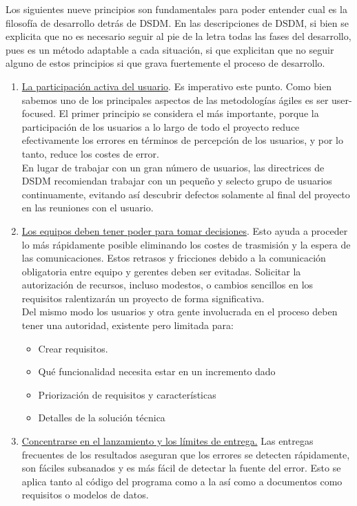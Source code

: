 \documentclass[12pt,a4paper]{article}
\begin{document}
Los siguientes nueve principios son fundamentales para poder entender cual es la filosofía de desarrollo detrás de DSDM. En las descripciones de DSDM, si bien se explicita que no es necesario seguir al pie de la letra todas las fases del desarrollo, pues es un método adaptable a cada situación, si que explicitan que no seguir alguno de estos principios si que grava fuertemente el proceso de desarrollo.

\begin{enumerate}
	\item \underline{La participación activa del usuario}. Es imperativo este punto. Como bien sabemos uno de los principales aspectos de las metodologías ágiles es ser user-focused. El primer principio se considera el más importante, porque la participación de los usuarios a lo largo de todo el proyecto reduce efectivamente los errores en términos de percepción de los usuarios, y por lo tanto, reduce los costes de error. \\


En lugar de trabajar con un gran número de usuarios, las directrices de  DSDM  recomiendan trabajar con un pequeño y selecto grupo de usuarios continuamente, evitando así descubrir defectos solamente al final del proyecto en las reuniones con el usuario.\\


\item \underline{Los equipos deben tener poder para tomar decisiones}. Esto ayuda a proceder lo más rápidamente posible eliminando los costes de trasmisión y la espera de las comunicaciones. Estos retrasos y fricciones debido a la comunicación obligatoria entre equipo y gerentes deben ser evitadas. Solicitar
la autorización de recursos, incluso modestos, o cambios sencillos en los requisitos ralentizarán un proyecto de forma significativa.\\

 Del mismo modo los usuarios y otra gente involucrada en el proceso deben tener una autoridad, existente pero limitada para:
\begin{itemize}
	\item  Crear requisitos.
    \item Qué funcionalidad necesita estar en un incremento dado
    \item Priorización de requisitos y características
    \item Detalles de la solución técnica
\end{itemize}


\item \underline{Concentrarse en el lanzamiento y los límites de entrega.} Las entregas frecuentes de los resultados aseguran que los errores se detecten rápidamente, son fáciles subsanados y es más fácil de detectar la fuente del error. Esto se aplica tanto al código del programa como a la
así como a documentos como requisitos o modelos de datos.



\end{enumerate}
\end{document}
